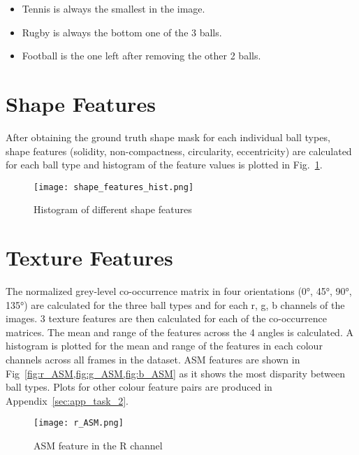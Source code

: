 \documentclass{report}
\begin{document}
\begin{itemize}
    \item Tennis is always the smallest in the image.
    \item Rugby is always the bottom one of the 3 balls.
    \item Football is the one left after removing the other 2 balls.
\end{itemize}

\section{Shape Features}

After obtaining the ground truth shape mask for each individual ball types, shape features (solidity, non-compactness\cite{westenbergVolumetricAttributeFiltering2007,bosiljConnectedAttributeMorphology2018}, circularity\cite{zunicHuMomentInvariant2010}, eccentricity) are calculated for each ball type and histogram of the feature values is plotted in Fig.~\ref{fig:shape_features_hist}.

\begin{figure}[ht]
    \centering
    \texttt{[image: shape\_features\_hist.png]}
    \caption{Histogram of different shape features}
    \label{fig:shape_features_hist}
\end{figure}

\section{Texture Features}

The normalized grey-level co-occurrence matrix in four orientations (0°, 45°, 90°, 135°) are calculated for the three ball types and for each r, g, b channels of the images. 3 texture features are then calculated for each of the co-occurrence matrices. The mean and range of the features across the 4 angles is calculated. A histogram is plotted for the mean and range of the features in each colour channels across all frames in the dataset. ASM features are shown in Fig~\cref{fig:r_ASM,fig:g_ASM,fig:b_ASM} as it shows the most disparity between ball types. Plots for other colour feature pairs are produced in Appendix~\ref{sec:app_task_2}.

\begin{figure}[ht]
    \centering
    \texttt{[image: r\_ASM.png]}
    \caption{ASM feature in the R channel}
    \label{fig:r_ASM}
\end{figure}
\end{document}
